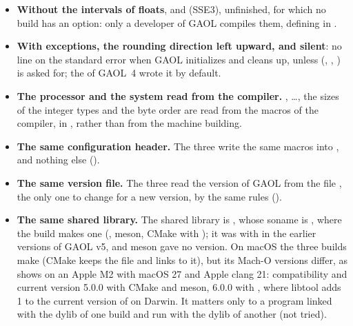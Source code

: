 \begin{itemize}
  them, which  checks, and the operations test nothing as
  they run (). Never with GCC for Windows (MinGW-w64,
  Cygwin), which does not align the stack for the AVX-512 registers (GCC bug
  54412; nor for the 256-bit ones of AVX, which
   keeps MinGW-w64 GCC out of). No flag to
  compile: the functions of the path alone carry the target attribute, which
  Visual C++ has not and needs not, taking the intrinsics of any instruction
  set in any function. Visual C++ has no ,
  and the one of clang-cl needs the runtime library of LLVM: both tell the
  processor by  and .\newinvfive
{}%
\item[$\bullet$] \textbf{Without the intervals of floats},
   and  (SSE3), unfinished, for
  which no build has an option: only a developer of GAOL compiles them,
  defining  in .
\item[$\bullet$] \textbf{With exceptions, the rounding direction left upward,
  and silent}: no line on the standard error when GAOL initializes and cleans
  up, unless  (,
  , ) is asked
  for; the  of GAOL~4 wrote it by default.\newinvfive
\item[$\bullet$] \textbf{The processor and the system read from the
  compiler.} , \ldots, the
  sizes of the integer types and the byte order are read from the macros of
  the compiler, in , rather than from the machine
  building.
\item[$\bullet$] \textbf{The same configuration header.} The three write the
  same macros into , and nothing else
  ().\newinvfive
\item[$\bullet$] \textbf{The same version file.} The three read the version
  of GAOL from the file , the only one to change for a new
  version, by the same rules ().\newinvfive
\item[$\bullet$] \textbf{The same shared library.} The shared library is
  , whose soname is , where the
  build makes one (, meson, CMake with
  ); it was  with
   in the earlier versions of GAOL v5, and meson gave no
  version. On macOS the three builds make  (CMake keeps
  the file  and links to it), but its Mach-O
  versions differ, as  shows on an Apple M2 with macOS 27 and
  Apple clang 21: compatibility and current version 5.0.0 with CMake and
  meson, 6.0.0 with , where libtool adds 1 to the current
  version of  on Darwin. It matters only to a program
  linked with the dylib of one build and run with the dylib of another (not
  tried).\newinvfive
{}%
\end{itemize}

